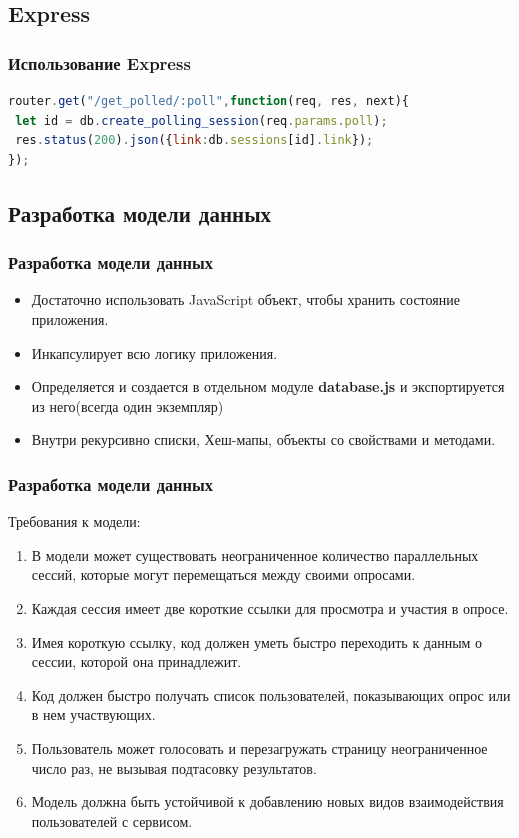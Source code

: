 \documentclass{beamer}
\begin{document}
\subsection{Express}
\begin{frame}[fragile] %
\frametitle{Использование Express}

\begin{lstlisting}[language=JavaScript,columns=fullflexible]
router.get("/get_polled/:poll",function(req, res, next){
 let id = db.create_polling_session(req.params.poll);
 res.status(200).json({link:db.sessions[id].link});
});
\end{lstlisting}
\end{frame}



\subsection{Разработка модели данных}
\begin{frame}
\frametitle{Разработка модели данных}
	\begin{itemize}
		\item Достаточно использовать JavaScript объект, чтобы хранить состояние приложения.
		\item Инкапсулирует всю логику приложения.
		\item Определяется и создается в отдельном модуле \textbf{database.js} и экспортируется из него(всегда один экземпляр)
		\item Внутри рекурсивно списки, Хеш-мапы, объекты со свойствами и методами.
	\end{itemize}
\end{frame}


\begin{frame}
\frametitle{Разработка модели данных}
	Требования к модели:
\begin{enumerate}
	\item В модели может существовать неограниченное количество параллельных сессий, которые могут перемещаться между своими опросами.
	\item Каждая сессия имеет две короткие ссылки для просмотра и участия в опросе. 
	\item Имея короткую ссылку, код должен уметь быстро переходить к данным о сессии, которой она принадлежит.
	\item Код должен быстро получать список пользователей, показывающих опрос или в нем участвующих.
	\item Пользователь может голосовать и перезагружать страницу неограниченное число раз, не вызывая подтасовку результатов.
	\item Модель должна быть устойчивой к добавлению новых видов взаимодействия пользователей с сервисом.
\end{enumerate}
\end{frame}
\end{document}
